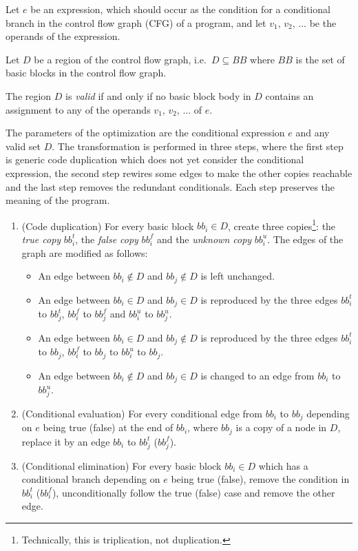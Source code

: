 \documentclass[halfparskip]{scrartcl}
\begin{document}
Let $e$ be an expression, which should occur as the condition for a conditional branch in the control flow graph (CFG) of a program, and let $v_1,\,v_2,\,\ldots$ be the operands of the expression.

Let $D$ be a region of the control flow graph, i.e.\ $D\subseteq BB$ where $BB$ is the set of basic blocks in the control flow graph.

The region $D$ is \textit{valid} if and only if no basic block body in $D$ contains an assignment to any of the operands $v_1,\,v_2,\,\ldots$ of $e$.

The parameters of the optimization are the conditional expression $e$ and any valid set $D$. The transformation is performed in three steps, where the first step is generic code duplication which does not yet consider the conditional expression, the second step rewires some edges to make the other copies reachable and the last step removes the redundant conditionals. Each step preserves the meaning of the program.

\begin{enumerate}
\item (Code duplication) For every basic block $bb_i\in D$, create three copies\footnote{Technically, this is triplication, not duplication.}: the \textit{true copy} $bb_i^t$, the \textit{false copy} $bb_i^f$ and the \textit{unknown copy} $bb_i^u$. The edges of the graph are modified as follows:
\begin{itemize}
\item An edge between $bb_i\notin D$ and $bb_j\notin D$ is left unchanged.
\item An edge between $bb_i\in D$ and $bb_j\in D$ is reproduced by the three edges $bb_i^t$ to $bb_j^t$, $bb_i^f$ to $bb_j^f$ and $bb_i^u$ to $bb_j^u$.
\item An edge between $bb_i\in D$ and $bb_j\notin D$ is reproduced by the three edges $bb_i^t$ to $bb_j$, $bb_i^f$ to $bb_j$ to $bb_i^u$ to $bb_j$.
\item An edge between $bb_i\notin D$ and $bb_j\in D$ is changed to an edge from $bb_i$ to $bb_j^u$.
\end{itemize}
\item (Conditional evaluation) For every conditional edge from $bb_i$ to $bb_j$ depending on $e$ being true (false) at the end of $bb_i$, where $bb_j$ is a copy of a node in $D$, replace it by an edge $bb_i$ to $bb_j^t$ ($bb_j^f$).
\item (Conditional elimination) For every basic block $bb_i\in D$ which has a conditional branch depending on $e$ being true (false), remove the condition in $bb_i^t$ ($bb_i^f$), unconditionally follow the true (false) case and remove the other edge.
\end{enumerate}
\end{document}
